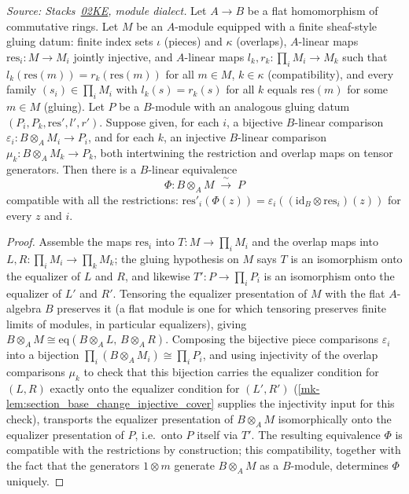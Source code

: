 \begin{lemma}
  \label{mk-lem:section_base_change_gluing_ladder}
  \leanok
  \textit{Source: Stacks~\href{https://stacks.math.columbia.edu/tag/02KE}{02KE},
  module dialect.}
  Let \(A \to B\) be a flat homomorphism of commutative rings. Let \(M\) be
  an \(A\)-module equipped with a finite sheaf-style gluing datum: finite
  index sets \(\iota\) (pieces) and \(\kappa\) (overlaps), \(A\)-linear maps
  \(\mathrm{res}_i : M \to M_i\) jointly injective, and \(A\)-linear maps
  \(l_k, r_k : \prod_i M_i \to M_k\) such that \(l_k(\mathrm{res}(m)) =
  r_k(\mathrm{res}(m))\) for all \(m \in M\), \(k \in \kappa\)
  (compatibility), and every family \((s_i) \in \prod_i M_i\) with
  \(l_k(s) = r_k(s)\) for all \(k\) equals \(\mathrm{res}(m)\) for some
  \(m \in M\) (gluing). Let \(P\) be a \(B\)-module with an analogous
  gluing datum \((P_i, P_k, \mathrm{res}', l', r')\). Suppose given, for
  each \(i\), a bijective \(B\)-linear comparison
  \(\varepsilon_i : B \otimes_A M_i \to P_i\), and for each \(k\), an
  injective \(B\)-linear comparison \(\mu_k : B \otimes_A M_k \to P_k\),
  both intertwining the restriction and overlap maps on tensor generators.
  Then there is a \(B\)-linear equivalence
  \[
    \Phi : B \otimes_A M \;\xrightarrow{\ \sim\ }\; P
  \]
  compatible with all the restrictions:
  \(\mathrm{res}'_i(\Phi(z)) = \varepsilon_i((\mathrm{id}_B \otimes
  \mathrm{res}_i)(z))\) for every \(z\) and \(i\).
\end{lemma}
\begin{proof}
  \leanok{}
  Assemble the maps \(\mathrm{res}_i\) into \(T : M \to \prod_i M_i\) and
  the overlap maps into \(L, R : \prod_i M_i \to \prod_k M_k\); the gluing
  hypothesis on \(M\) says \(T\) is an isomorphism onto the equalizer of
  \(L\) and \(R\), and likewise \(T' : P \to \prod_i P_i\) is an
  isomorphism onto the equalizer of \(L'\) and \(R'\). Tensoring the
  equalizer presentation of \(M\) with the flat \(A\)-algebra \(B\)
  preserves it (a flat module is one for which tensoring preserves finite
  limits of modules, in particular equalizers), giving
  \(B \otimes_A M \cong \mathrm{eq}(B \otimes_A L,\, B \otimes_A R)\).
  Composing the bijective piece comparisons \(\varepsilon_i\) into a
  bijection \(\prod_i(B \otimes_A M_i) \cong \prod_i P_i\), and using
  injectivity of the overlap comparisons \(\mu_k\) to check that this
  bijection carries the equalizer condition for \((L,R)\) exactly onto the
  equalizer condition for \((L',R')\) (\ref{mk-lem:section_base_change_injective_cover}
  supplies the injectivity input for this check), transports the equalizer
  presentation of \(B \otimes_A M\) isomorphically onto the equalizer
  presentation of \(P\), i.e.\ onto \(P\) itself via \(T'\). The resulting
  equivalence \(\Phi\) is compatible with the restrictions by construction;
  this compatibility, together with the fact that the generators
  \(1 \otimes m\) generate \(B \otimes_A M\) as a \(B\)-module, determines
  \(\Phi\) uniquely.
\end{proof}

